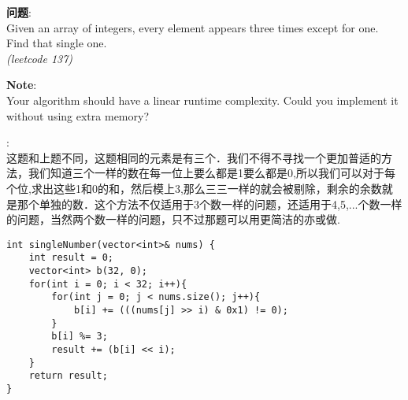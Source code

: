     
\begin{description}
    \item{\textbf{问题}}:\\
Given an array of integers, every element appears three times except for one. Find that single one.\\
\textit{(leetcode 137)}
    \item{\textbf{Note}}:\\
Your algorithm should have a linear runtime complexity. Could you implement it without using extra memory?
    \item{\textbf{}} : 
    \\这题和上题不同，这题相同的元素是有三个．我们不得不寻找一个更加普适的方法，我们知道三个一样的数在每一位上要么都是1要么都是0,所以我们可以对于每个位,求出这些1和0的和，然后模上3,那么三三一样的就会被剔除，剩余的余数就是那个单独的数．这个方法不仅适用于3个数一样的问题，还适用于4,5,...个数一样的问题，当然两个数一样的问题，只不过那题可以用更简洁的亦或做.
    \begin{lstlisting}
int singleNumber(vector<int>& nums) {
	int result = 0;
	vector<int> b(32, 0);
	for(int i = 0; i < 32; i++){
		for(int j = 0; j < nums.size(); j++){
			b[i] += (((nums[j] >> i) & 0x1) != 0);
		}
		b[i] %= 3;
		result += (b[i] << i);
	}
	return result;
}
    \end{lstlisting}
\end{description}
